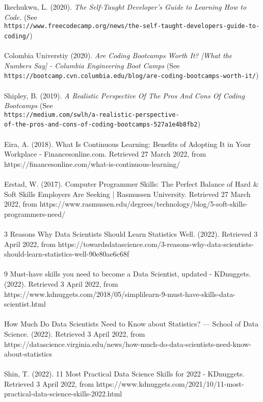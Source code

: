 \documentclass[a4paper, 11pt]{report}
\begin{document}
Ikechukwu, L. (2020). \textit{The Self-Taught Developer's Guide to Learning How to Code.} (See\\ \texttt{https://www.freecodecamp.org/news/the-self-taught-developers-guide-to-coding/})
\\
\\
Colombia Universtiy (2020). \textit{Are Coding Bootcamps Worth It? [What the Numbers Say] - Columbia Engineering Boot Camps} (See\\ \texttt{https://bootcamp.cvn.columbia.edu/blog/are-coding-bootcamps-worth-it/}) 
\\
\\
Shipley, B. (2019). \textit{A Realistic Perspective Of The Pros And Cons Of Coding Bootcamps} (See\\ \texttt{https://medium.com/swlh/a-realistic-perspective-\\
	of-the-pros-and-cons-of-coding-bootcamps-527a1e4b8fb2}) 
\\
\\
Eira, A. (2018). What Is Continuous Learning: Benefits of Adopting It in Your Workplace - Financesonline.com. Retrieved 27 March 2022, from https://financesonline.com/what-is-continuous-learning/
\\
\\
Erstad, W. (2017). Computer Programmer Skills: The Perfect Balance of Hard \& Soft Skills Employers Are Seeking | Rasmussen University. Retrieved 27 March 2022, from https://www.rasmussen.edu/degrees/technology/blog/5-soft-skills-programmers-need/
\\
\\
3 Reasons Why Data Scientists Should Learn Statistics Well. (2022). Retrieved 3 April 2022, from https://towardsdatascience.com/3-reasons-why-data-scientists-should-learn-statistics-well-90e80ae6c68f
\\
\\
9 Must-have skills you need to become a Data Scientist, updated - KDnuggets. (2022). Retrieved 3 April 2022, from https://www.kdnuggets.com/2018/05/simplilearn-9-must-have-skills-data-scientist.html
\\
\\
How Much Do Data Scientists Need to Know about Statistics? — School of Data Science. (2022). Retrieved 3 April 2022, from https://datascience.virginia.edu/news/how-much-do-data-scientists-need-know-about-statistics
\\
\\
Shin, T. (2022). 11 Most Practical Data Science Skills for 2022 - KDnuggets. Retrieved 3 April 2022, from https://www.kdnuggets.com/2021/10/11-most-practical-data-science-skills-2022.html
\end{document}
